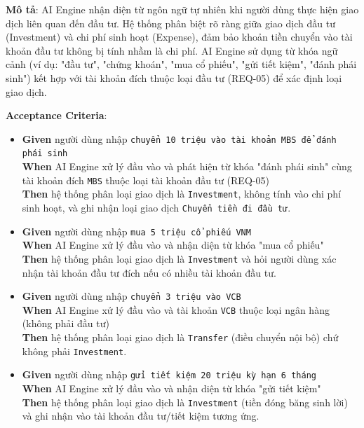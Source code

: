 \textbf{Mô tả}: AI Engine nhận diện từ ngôn ngữ tự nhiên khi người dùng thực hiện giao dịch liên quan đến đầu tư. Hệ thống phân biệt rõ ràng giữa giao dịch đầu tư (Investment) và chi phí sinh hoạt (Expense), đảm bảo khoản tiền chuyển vào tài khoản đầu tư không bị tính nhầm là chi phí. AI Engine sử dụng từ khóa ngữ cảnh (ví dụ: "đầu tư", "chứng khoán", "mua cổ phiếu", "gửi tiết kiệm", "đánh phái sinh") kết hợp với tài khoản đích thuộc loại đầu tư (REQ-05) để xác định loại giao dịch.



\textbf{Acceptance Criteria}:

\begin{itemize}
\item \textbf{Given} người dùng nhập \texttt{chuyển 10 triệu vào tài khoản MBS để đánh phái sinh}  \\ \hspace*{1.5em}  \textbf{When} AI Engine xử lý đầu vào và phát hiện từ khóa "đánh phái sinh" cùng tài khoản đích \texttt{MBS} thuộc loại tài khoản đầu tư (REQ-05)  \\ \hspace*{1.5em}  \textbf{Then} hệ thống phân loại giao dịch là \texttt{Investment}, không tính vào chi phí sinh hoạt, và ghi nhận loại giao dịch \texttt{Chuyển tiền đi đầu tư}.
\item \textbf{Given} người dùng nhập \texttt{mua 5 triệu cổ phiếu VNM}  \\ \hspace*{1.5em}  \textbf{When} AI Engine xử lý đầu vào và nhận diện từ khóa "mua cổ phiếu"  \\ \hspace*{1.5em}  \textbf{Then} hệ thống phân loại giao dịch là \texttt{Investment} và hỏi người dùng xác nhận tài khoản đầu tư đích nếu có nhiều tài khoản đầu tư.
\item \textbf{Given} người dùng nhập \texttt{chuyển 3 triệu vào VCB}  \\ \hspace*{1.5em}  \textbf{When} AI Engine xử lý đầu vào và tài khoản \texttt{VCB} thuộc loại ngân hàng (không phải đầu tư)  \\ \hspace*{1.5em}  \textbf{Then} hệ thống phân loại giao dịch là \texttt{Transfer} (điều chuyển nội bộ) chứ không phải \texttt{Investment}.
\item \textbf{Given} người dùng nhập \texttt{gửi tiết kiệm 20 triệu kỳ hạn 6 tháng}  \\ \hspace*{1.5em}  \textbf{When} AI Engine xử lý đầu vào và nhận diện từ khóa "gửi tiết kiệm"  \\ \hspace*{1.5em}  \textbf{Then} hệ thống phân loại giao dịch là \texttt{Investment} (tiền đóng băng sinh lời) và ghi nhận vào tài khoản đầu tư/tiết kiệm tương ứng.

\end{itemize}
